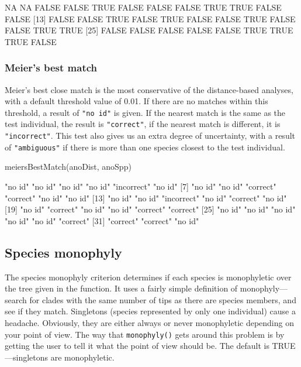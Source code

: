 \documentclass{article}
\newcommand{\fun}[1]{\texttt{#1}}
\begin{document}
\begin{Routput}
 [1]    NA    NA FALSE FALSE  TRUE FALSE FALSE FALSE  TRUE  TRUE FALSE FALSE
[13] FALSE FALSE  TRUE FALSE  TRUE FALSE FALSE  TRUE FALSE FALSE  TRUE  TRUE
[25] FALSE FALSE FALSE FALSE FALSE  TRUE  TRUE  TRUE FALSE
\end{Routput}

\subsubsection{Meier's best match}
Meier's best close match \citep{Meier.2006} is the most conservative of the distance-based analyses, with a default threshold value of 0.01. If there are no matches within this threshold, a result of \fun{"no id"} is given. If the nearest match is the same as the test individual, the result is \fun{"correct"}, if the nearest match is different, it is \fun{"incorrect"}. This test also gives us an extra degree of uncertainty, with a result of \fun{"ambiguous"} if there is more than one species closest to the test individual.

\begin{console}
meiersBestMatch(anoDist, anoSpp)
\end{console}

\begin{Routput}
 [1] "no id"     "no id"     "no id"     "no id"     "incorrect" "no id"    
 [7] "no id"     "no id"     "correct"   "correct"   "no id"     "no id"    
[13] "no id"     "no id"     "incorrect" "no id"     "correct"   "no id"    
[19] "no id"     "correct"   "no id"     "no id"     "correct"   "correct"  
[25] "no id"     "no id"     "no id"     "no id"     "no id"     "correct"  
[31] "correct"   "correct"   "no id" 
\end{Routput}

\subsection{Species monophyly}
The species monophyly criterion determines if each species is monophyletic over the tree given in the function. It uses a fairly simple definition of monophyly---search for clades with the same number of tips as there are species members, and see if they match. Singletons (species represented by only one individual) cause a headache. Obviously, they are either always or never monophyletic depending on your point of view. The way that \fun{monophyly()} gets around this problem is by getting the user to tell it what the point of view should be. The default is TRUE---singletons are monophyletic.
\end{document}
